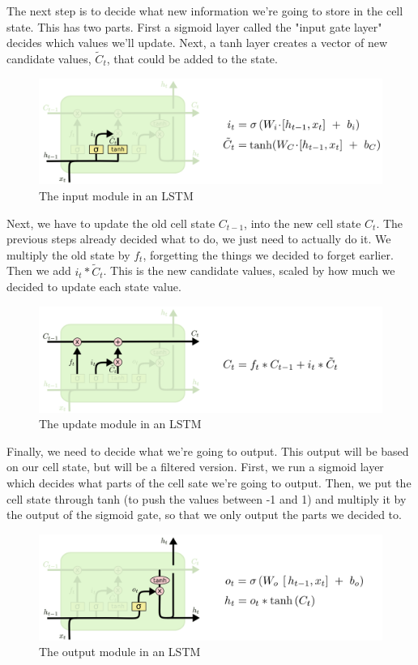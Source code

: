 \documentclass{article}
\begin{document}
The next step is to decide what new information we're going to store in the cell state.
This has two parts.
First a sigmoid layer called the "input gate layer" decides which values we'll update.
Next, a tanh layer creates a vector of new candidate values, $\tilde{C}_t$, that could be added to the state.

\begin{figure}[htbp]
  \centering
  \includegraphics[width=0.6\linewidth]{img/lstm_input.png}
  \caption{The input module in an LSTM}
  \label{fig:lstm_input}
\end{figure}

Next, we have to update the old cell state $C_{t-1}$, into the new cell state $C_t$.
The previous steps already decided what to do, we just need to actually do it.
We multiply the old state by $f_t$, forgetting the things we decided to forget earlier.
Then we add $i_t * \tilde{C}_t$.
This is the new candidate values, scaled by how much we decided to update each state value.

\begin{figure}[htbp]
  \centering
  \includegraphics[width=0.6\linewidth]{img/lstm_update.png}
  \caption{The update module in an LSTM}
  \label{fig:lstm_update}
\end{figure}

Finally, we need to decide what we're going to output.
This output will be based on our cell state, but will be a filtered version.
First, we run a sigmoid layer which decides what parts of the cell sate we're going to output.
Then, we put the cell state through tanh (to push the values between -1 and 1) and multiply it by the output of the sigmoid gate, so that we only output the parts we decided to.

\begin{figure}[htbp]
  \centering
  \includegraphics[width=0.6\linewidth]{img/lstm_output.png}
  \caption{The output module in an LSTM}
  \label{fig:lstm_output}
\end{figure}
\end{document}
